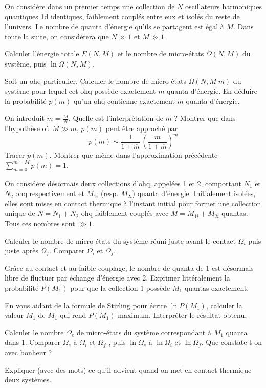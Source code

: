 \documentclass[utf8, 11pt]{feuille}
\begin{document}
On considère dans un premier temps une collection de $N $ oscillateurs harmoniques quantiques 1{\sc d} identiques, faiblement couplés entre eux et isolés du reste de l'univers. Le nombre de quanta d'énergie qu'ils se partagent est égal à $M$. Dans toute la suite, on considérera  que $N \gg 1$ et $M \gg 1$.

\question
Calculer l'énergie totale $E(N,M)$ et le nombre de micro-états $\Omega(N,M)$ du système, puis $\ln \Omega(N,M)$.

\question
Soit un {\sc ohq} particulier. Calculer le nombre de micro-états $\Omega(N,M|m)$ du système pour lequel cet {\sc ohq} possède exactement $m$ quanta d'énergie. En déduire la probabilité $p(m)$ qu'un {\sc ohq} contienne exactement $m$ quanta d'énergie.

\question
On introduit $\overline m= \frac{M}{N}$. Quelle est l'interprétation de $\overline m$ ? Montrer que dans l'hypothèse où $M \gg m$, $p(m)$ peut être approché par
$$
p(m) \sim \frac{1}{1+\overline m} \, \left(\frac{\overline m}{1+\overline m}\right)^m
$$
Tracer $p(m)$. Montrer que même dans l'approximation précédente $\sum_{m=0}^{m=M}p(m)=1$.

\medskip
On considère désormais deux collections d'{\sc ohq}, appelées 1 et 2,  comportant $N_1$ et $N_2$ {\sc ohq} respectivement et $M_{1i}$ (resp. $M_{2i}$) quanta d'énergie. Initialement isolées, elles sont mises en contact thermique à l'instant initial pour former une collection unique de $N=N_1+N_2$ {\sc ohq} faiblement couplés avec $M=M_{1i}+M_{2i}$ quantas. Tous ces nombres sont $\gg 1$.

\question
Calculer le nombre de micro-états du système réuni juste avant le contact $\Omega_i$ puis juste après $\Omega_f$. Comparer $\Omega_i$  et $\Omega_f$.

\question
Grâce au contact et au faible couplage, le nombre de quanta de 1 est désormais libre de fluctuer par échange d'énergie avec 2. Exprimer littéralement la probabilité $P(M_1)$ pour que la collection 1 possède $M_1$ quantas exactement.  

\question
En vous aidant de la formule de Stirling pour écrire $\ln P(M_1)$, calculer la valeur $\overline {M_1}$ de $M_1$ qui rend $P(M_1)$ maximum. Interpréter le résultat obtenu.

\question
Calculer le nombre $\Omega_e$ de micro-états du système correspondant à  $\overline{M_1}$ quanta dans 1. Comparer $\Omega_e$  à $\Omega_i$  et $\Omega_f$ , puis $\ln \Omega_e$  à $\ln \Omega_i$  et $\ln \Omega_f$. Que constate-t-on avec bonheur ?

\question
Expliquer (avec des mots) ce qu'il advient quand on met en contact thermique deux systèmes.
\end{document}
